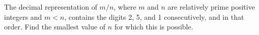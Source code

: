 The decimal representation of $m/n$, where $m$ and $n$ are relatively prime positive integers and $m < n$, contains the digits 2, 5, and 1 consecutively, and in that order.  Find the smallest value of $n$ for which this is possible.